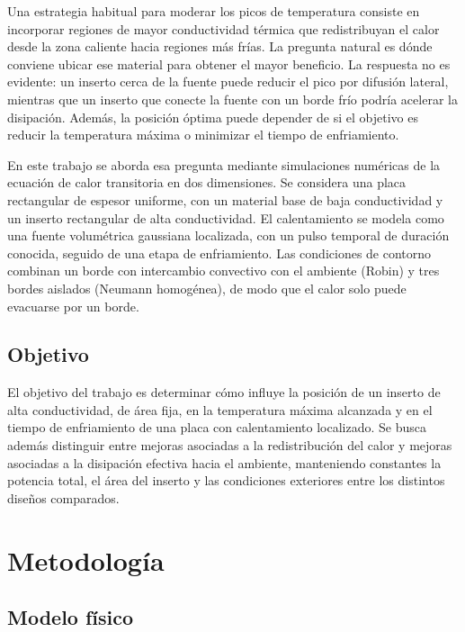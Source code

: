\documentclass[11pt,a4paper]{article}
\begin{document}
Una estrategia habitual para moderar los picos de temperatura consiste en incorporar regiones de mayor conductividad térmica que redistribuyan el calor desde la zona caliente hacia regiones más frías. La pregunta natural es dónde conviene ubicar ese material para obtener el mayor beneficio. La respuesta no es evidente: un inserto cerca de la fuente puede reducir el pico por difusión lateral, mientras que un inserto que conecte la fuente con un borde frío podría acelerar la disipación. Además, la posición óptima puede depender de si el objetivo es reducir la temperatura máxima o minimizar el tiempo de enfriamiento.

En este trabajo se aborda esa pregunta mediante simulaciones numéricas de la ecuación de calor transitoria en dos dimensiones. Se considera una placa rectangular de espesor uniforme, con un material base de baja conductividad y un inserto rectangular de alta conductividad. El calentamiento se modela como una fuente volumétrica gaussiana localizada, con un pulso temporal de duración conocida, seguido de una etapa de enfriamiento. Las condiciones de contorno combinan un borde con intercambio convectivo con el ambiente (Robin) y tres bordes aislados (Neumann homogénea), de modo que el calor solo puede evacuarse por un borde.

\subsection*{Objetivo}

El objetivo del trabajo es determinar cómo influye la posición de un inserto de alta conductividad, de área fija, en la temperatura máxima alcanzada y en el tiempo de enfriamiento de una placa con calentamiento localizado. Se busca además distinguir entre mejoras asociadas a la redistribución del calor y mejoras asociadas a la disipación efectiva hacia el ambiente, manteniendo constantes la potencia total, el área del inserto y las condiciones exteriores entre los distintos diseños comparados.



%

\section{Metodología}

\subsection{Modelo físico}
\end{document}
